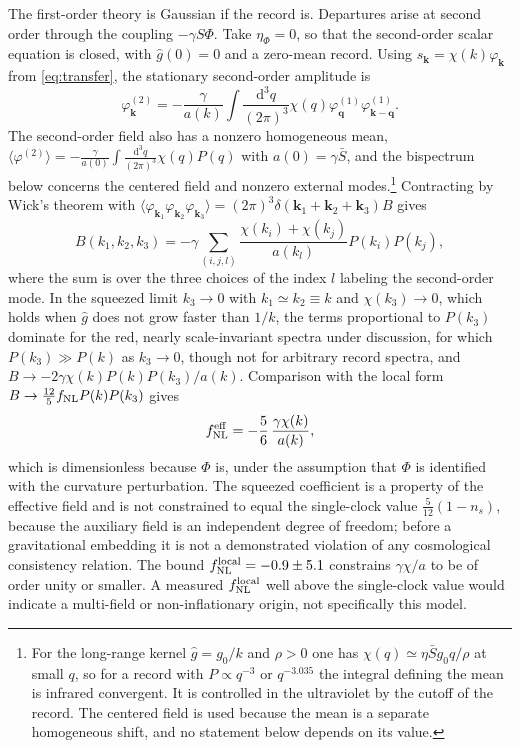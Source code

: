 \documentclass[11pt]{article}
\theoremstyle{definition}
\theoremstyle{remark}
\newcommand{\dd}{\mathrm{d}}
\newcommand{\Sb}{\bar{S}}
\begin{document}
The first-order theory is Gaussian if the record is. Departures arise at second order through the coupling $-\gamma S\Phi$. Take $\eta_\Phi=0$, so that the second-order scalar equation is closed, with $\hat g(0)=0$ and a zero-mean record. Using $s_{\mathbf k}=\chi(k)\varphi_{\mathbf k}$ from \eqref{eq:transfer}, the stationary second-order amplitude is
\begin{equation}
\varphi^{(2)}_{\mathbf k}=-\frac\gamma{a(k)}\int\frac{\dd^3q}{(2\pi)^3}\chi(q)\varphi^{(1)}_{\mathbf q}\varphi^{(1)}_{\mathbf k-\mathbf q}.
\end{equation}
The second-order field also has a nonzero homogeneous mean, $\langle\varphi^{(2)}\rangle=-\frac{\gamma}{a(0)}\int\frac{\dd^3q}{(2\pi)^3}\chi(q)P(q)$ with $a(0)=\gamma\Sb$, and the bispectrum below concerns the centered field and nonzero external modes.\footnote{For the long-range kernel $\hat g=g_0/k$ and $\rho>0$ one has $\chi(q)\simeq\eta\Sb g_0q/\rho$ at small $q$, so for a record with $P\propto q^{-3}$ or $q^{-3.035}$ the integral defining the mean is infrared convergent. It is controlled in the ultraviolet by the cutoff of the record. The centered field is used because the mean is a separate homogeneous shift, and no statement below depends on its value.} Contracting by Wick's theorem with $\langle\varphi_{\mathbf k_1}\varphi_{\mathbf k_2}\varphi_{\mathbf k_3}\rangle=(2\pi)^3\delta(\mathbf k_1+\mathbf k_2+\mathbf k_3)B$ gives
\begin{equation}
B(k_1,k_2,k_3)=-\gamma\sum_{(i,j,l)}\frac{\chi(k_i)+\chi(k_j)}{a(k_l)}P(k_i)P(k_j),
\label{eq:bispec}
\end{equation}
where the sum is over the three choices of the index $l$ labeling the second-order mode. In the squeezed limit $k_3\to0$ with $k_1\simeq k_2\equiv k$ and $\chi(k_3)\to0$, which holds when $\hat g$ does not grow faster than $1/k$, the terms proportional to $P(k_3)$ dominate for the red, nearly scale-invariant spectra under discussion, for which $P(k_3)\gg P(k)$ as $k_3\to0$, though not for arbitrary record spectra, and $B\to-2\gamma\chi(k)P(k)P(k_3)/a(k)$. Comparison with the local form $B\to\frac{12}5f_{\rm NL}P(k)P(k_3)$ gives
\begin{equation}
f_{\rm NL}^{\rm eff}=-\frac56\,\frac{\gamma\chi(k)}{a(k)},
\end{equation}
which is dimensionless because $\Phi$ is, under the assumption that $\Phi$ is identified with the curvature perturbation. The squeezed coefficient is a property of the effective field and is not constrained to equal the single-clock value $\frac5{12}(1-n_s)$, because the auxiliary field is an independent degree of freedom; before a gravitational embedding it is not a demonstrated violation of any cosmological consistency relation. The bound $f_{\rm NL}^{\rm local}=-0.9\pm5.1$ \cite{planck2018ix} constrains $\gamma\chi/a$ to be of order unity or smaller. A measured $f_{\rm NL}^{\rm local}$ well above the single-clock value would indicate a multi-field or non-inflationary origin, not specifically this model.
\end{document}
